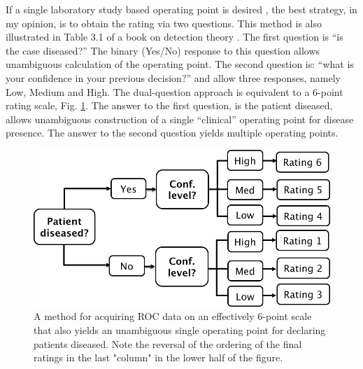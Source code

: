 \documentclass[
]{book}
\begin{document}
If a single laboratory study based operating point is desired \citep{RN2660}, the best strategy, in my opinion, is to obtain the rating via two questions. This method is also illustrated in Table 3.1 of a book on detection theory \citep{macmillan2004detection}. The first question is ``is the case diseased?'' The binary (Yes/No) response to this question allows unambiguous calculation of the operating point. The second question is: ``what is your confidence in your previous decision?'' and allow three responses, namely Low, Medium and High. The dual-question approach is equivalent to a 6-point rating scale, Fig. \ref{fig:SixPointScale}. The answer to the first question, is the patient diseased, allows unambiguous construction of a single ``clinical'' operating point for disease presence. The answer to the second question yields multiple operating points.

\begin{figure}

{\centering \includegraphics[width=11.39in]{images/AcquiringData6PointScale} 

}

\caption{A method for acquiring ROC data on an effectively 6-point scale that also yields an unambiguous single operating point for declaring patients diseased. Note the reversal of the ordering of the final ratings in the last "column" in the lower half of the figure.}\label{fig:SixPointScale}
\end{figure}
\end{document}
